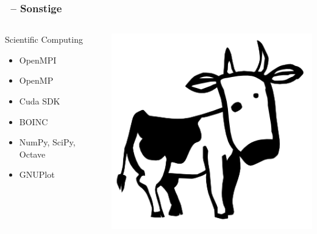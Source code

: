 \documentclass[utf8]{beamer}
\begin{document}
\begin{frame}
  \frametitle{\insertsectionhead\ -- Sonstige}
 
 
\begin{columns}
\begin{block}{Scientific Computing}
  \begin{itemize}
    \item OpenMPI
    \item OpenMP
    \item Cuda SDK
    \item BOINC
    \item NumPy, SciPy, Octave
    \item GNUPlot
    \vspace{0.5\baselineskip}
  \end{itemize}
\end{block}
\vspace{-10pt}
\begin{center}\includegraphics[scale=0.25]{larry_the_cow-full.png}\end{center}


\end{columns}
\end{frame}
\end{document}

